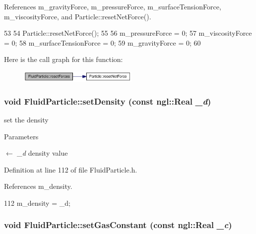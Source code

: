 References m\_\-gravityForce, m\_\-pressureForce, m\_\-surfaceTensionForce, m\_\-viscosityForce, and Particle::resetNetForce().




\begin{DoxyCode}
53 {
54     Particle::resetNetForce();
55 
56     m_pressureForce = 0;
57     m_viscosityForce = 0;
58     m_surfaceTensionForce = 0;
59     m_gravityForce = 0;
60 }
\end{DoxyCode}




Here is the call graph for this function:\nopagebreak
\begin{figure}[H]
\begin{center}
\leavevmode
\includegraphics[width=163pt]{class_fluid_particle_acc7205ff8364fd974adbb5bc6d890520_cgraph}
\end{center}
\end{figure}


\hypertarget{class_fluid_particle_acdb806b3044bed4ca7cad4a65bfc6aea}{
\subsubsection[{setDensity}]{\setlength{\rightskip}{0pt plus 5cm}void FluidParticle::setDensity (const ngl::Real {\em \_\-d})}}
\label{class_fluid_particle_acdb806b3044bed4ca7cad4a65bfc6aea}


set the density 


\begin{DoxyParams}{Parameters}
\item[\mbox{$\leftarrow$} {\em \_\-d}]density value \end{DoxyParams}


Definition at line 112 of file FluidParticle.h.



References m\_\-density.




\begin{DoxyCode}
112 { m_density = _d; }
\end{DoxyCode}


\hypertarget{class_fluid_particle_a814b73436943fccc64939d1dc1c1945d}{
\subsubsection[{setGasConstant}]{\setlength{\rightskip}{0pt plus 5cm}void FluidParticle::setGasConstant (const ngl::Real {\em \_\-c})}}
\label{class_fluid_particle_a814b73436943fccc64939d1dc1c1945d}


